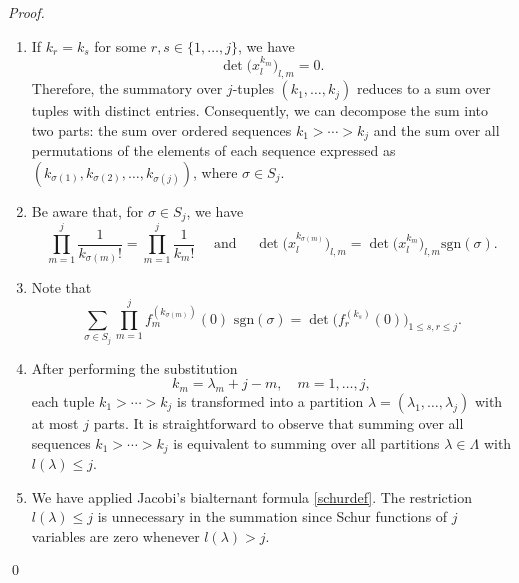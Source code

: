 \documentclass[10pt,a4paper]{amsart}
\begin{document}
\begin{proof}
\begin{enumerate}
    \item[(2)] If \(k_r = k_s\) for some \(r, s \in \{1, \dots, j\} \), we have  
    \[\det\Big(x_l^{k_m}\Big)_{l,m}=0.\]
 Therefore, the summatory over \(j\)-tuples \((k_1, \dots, k_j)\) reduces to a sum over tuples with distinct entries. Consequently, we can decompose the sum into two parts: the sum over ordered sequences \(k_1 > \cdots > k_j\) and the sum over all permutations of the elements of each sequence expressed as \((k_{\sigma(1)}, k_{\sigma(2)}, \dots, k_{\sigma(j)})\), where \(\sigma \in S_j\).
 
    
    
    \item[(3)] Be aware that, for $\sigma\in S_j$, we have 
    \begin{equation*}
      \prod_{m=1}^j \frac{1}{k_{\sigma(m)}!}= \prod_{m=1}^j \frac{1}{k_m!}\quad \text{ and }\quad \det\Big(x_l^{k_{\sigma(m)}}\Big)_{l,m}=\det\Big(x_l^{k_{m}}\Big)_{l,m}\text{sgn}(\sigma).
    \end{equation*}
    \item[(4)] Note that
    \begin{equation*}
        \sum_{\sigma\in S_j} \prod_{m=1}^j f_m^{(k_{\sigma(m)})}(0)\text{ sgn}(\sigma)=\det\Big(f_r^{(k_s)}(0)\Big)_{1\leq s,r\leq j}.
    \end{equation*}
    \item[(5)] 
After performing the substitution  
\begin{equation*}
    k_m = \lambda_m + j - m, \quad m = 1, \dots, j,
\end{equation*}  
each tuple \(k_1 > \cdots > k_j\) is transformed into a partition \(\lambda=(\lambda_1, \dots, \lambda_j)\) with at most \(j\) parts. It is straightforward to observe that summing over all sequences \(k_1 > \cdots > k_j\) is equivalent to summing over all partitions \(\lambda\in\Lambda\) with \(l(\lambda) \leq j\).  

\item[(6)] We have applied Jacobi's bialternant formula \eqref{schurdef}.  The restriction \(l(\lambda) \leq j\) is unnecessary in the summation since Schur functions of $j$ variables are zero whenever \(l(\lambda) > j\).  
\end{enumerate}
 \qed
\end{proof}
\end{document}
